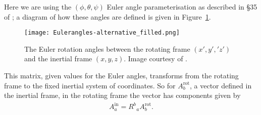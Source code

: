 \documentclass[../full_thesis/full_thesis.tex]{subfiles}
\begin{document}
Here we are using the
$(\phi, \theta, \psi)$ Euler
angle parameterisation as described in \S 35 of \citet{Landau1969}; a diagram of how
these angles are defined is given in Figure~\ref{fig: Euler}.\begin{figure}[ht]
\centering
\texttt{[image: Eulerangles-alternative\_filled.png]}
\caption{The Euler rotation angles between the rotating
frame $(x', y', 'z')$ and the inertial frame $(x, y, z)$. Image courtesy of
 \citet{WikipediaEuler}.}
\label{fig: Euler}
\end{figure}
This matrix, given values for the Euler angles, transforms from the rotating
frame to the fixed inertial system of coordinates. So for $A^{\textrm{rot}}_b$,
a vector defined in the inertial frame, in the rotating frame the vector has
components given by
\begin{align}
A^{\textrm{in}}_{a} = R^{b}_{\;\;a} A^{\textrm{rot}}_{b}.
\end{align}
\end{document}
